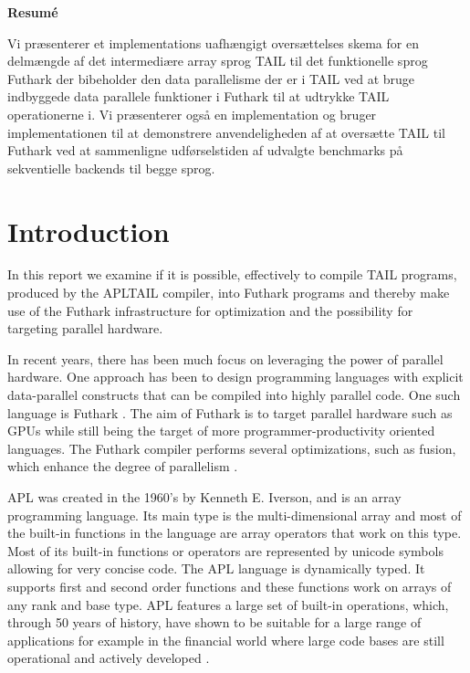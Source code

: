 \documentclass[11pt]{article}
\begin{document}
\begin{center}
\textbf{Resumé}
\end{center}
Vi præsenterer et implementations uafhængigt oversættelses skema for en delmængde af det intermediære array sprog TAIL til det funktionelle sprog Futhark der bibeholder den data parallelisme der er i TAIL ved at bruge indbyggede data parallele funktioner i Futhark til at udtrykke TAIL operationerne i. Vi præsenterer også en implementation og bruger implementationen til at demonstrere anvendeligheden af at oversætte TAIL til Futhark ved at sammenligne udførselstiden af udvalgte benchmarks på sekventielle backends til begge sprog.

\newpage

\tableofcontents

\newpage

\section{Introduction}
\label{intro}
In this report we examine if it is possible, effectively to compile TAIL programs, produced by the APLTAIL compiler, into Futhark programs and thereby make use of the Futhark infrastructure for optimization and the possibility for targeting parallel hardware.

In recent years, there has been much focus on leveraging the power of parallel hardware. 
One approach has been to design programming languages with explicit data-parallel constructs that can be compiled 
into highly parallel code. One such language is Futhark \cite{TroelsHenriksen}. The aim of Futhark is to target parallel hardware such as 
GPUs while still being the target of more programmer-productivity oriented languages. The Futhark compiler 
performs several optimizations, such as fusion, which enhance the degree of 
parallelism \cite{T.Henriksen&C.Oancea} \cite{T2graph} \cite{Hybrid}.

APL was created in the 1960's by Kenneth E. Iverson, and is an array programming language.
Its main type is the multi-dimensional array and most of the built-in functions in the language are array operators that work on this type. 
Most of its built-in functions or operators are represented by unicode symbols allowing for very concise code.
The APL language is dynamically typed. It supports first and second order functions and these functions work on arrays of any rank and base type.
APL features a large set of built-in operations, which, through 50 years of history, have shown to be suitable for a large range of applications for example in the financial world where large code bases are still operational and actively developed \cite{ElsmanDybdal:Array:2014} \cite{Array:2015}.
\end{document}
